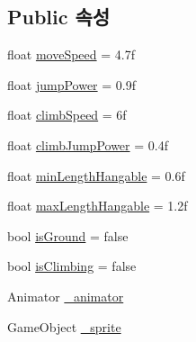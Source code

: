\subsection*{Public 속성}
\begin{DoxyCompactItemize}
\item 
float \mbox{\hyperlink{class_player_movement_a93207dc2742fe0f0b651a54d610b14aa}{move\+Speed}} = 4.\+7f
\item 
float \mbox{\hyperlink{class_player_movement_a7311cb033c65d133e59546388a1ad59d}{jump\+Power}} = 0.\+9f
\item 
float \mbox{\hyperlink{class_player_movement_a9f24ed81b8ddd8ad2bc4c9ae45203fcd}{climb\+Speed}} = 6f
\item 
float \mbox{\hyperlink{class_player_movement_a3b10fda58c5c9c3e0e00b34b531e8bf4}{climb\+Jump\+Power}} = 0.\+4f
\item 
float \mbox{\hyperlink{class_player_movement_ad37bd6a04342f85d26aa7c268a0c8c64}{min\+Length\+Hangable}} = 0.\+6f
\item 
float \mbox{\hyperlink{class_player_movement_afa2e0ac8637c0da3e1efa8191aac5433}{max\+Length\+Hangable}} = 1.\+2f
\item 
bool \mbox{\hyperlink{class_player_movement_a5272dbf3b96377dfecb127739bc7e639}{is\+Ground}} = false
\item 
bool \mbox{\hyperlink{class_player_movement_a76950ad9ffc2ff1ea99617345eb3074e}{is\+Climbing}} = false
\item 
Animator \mbox{\hyperlink{class_player_movement_ab8ae14c08d4ca210762a89345ad33294}{\+\_\+animator}}
\item 
Game\+Object \mbox{\hyperlink{class_player_movement_a8d5245144cd5777ff26b1f9f448796ff}{\+\_\+sprite}}
\end{DoxyCompactItemize}
